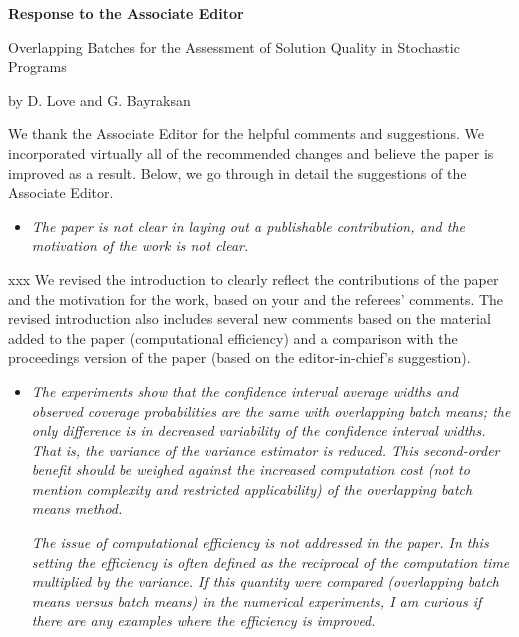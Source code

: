 \documentclass[11pt,notitlepage,onecolumn]{article}
\newcommand{\noi}{\noindent}
\begin{document}

\singlespacing

\baselineskip0.26in


\pagebreak

\begin{center}
\textbf{\Large Response to the Associate Editor} 
\medskip

{\large Overlapping Batches for the Assessment of Solution Quality in Stochastic Programs}
\medskip

{\footnotesize by D. Love and G. Bayraksan}
\end{center}

\bigskip

\bigskip 



We thank the Associate Editor for the helpful comments and suggestions. 
We incorporated virtually all of the recommended changes and believe the paper is improved as a result. 
Below, we go through in detail the suggestions of the Associate Editor.
\medskip


\begin{itemize}
\item[]\textit{The paper is not clear in laying out a publishable contribution, and the motivation of the work is not clear.}
\end{itemize}

\noi xxx 
We revised the introduction to clearly reflect the contributions of the paper and the motivation for the work, based on your and the referees' comments. 
The revised introduction also includes several new comments based on the material added to the paper (computational efficiency) and a comparison with the proceedings version of the paper (based on the editor-in-chief's suggestion). 
\medskip  

\begin{itemize}
\item[] \textit{%
The experiments show that the confidence interval average widths and observed coverage probabilities are the same with overlapping batch means; the only difference is in decreased variability of the confidence interval widths. 
That is, the variance of the variance estimator is reduced. 
This second-order benefit should be weighed against the increased computation cost (not to mention complexity and restricted applicability) of the overlapping batch means method.}

\textit{The issue of computational efficiency is not addressed  in the paper. 
In this setting the efficiency is often defined as the reciprocal of the computation time multiplied by the variance. 
If this quantity were compared (overlapping batch means versus batch means) in the numerical experiments, I am curious if there are any examples where the efficiency is improved.}
\end{itemize}
\end{document}
